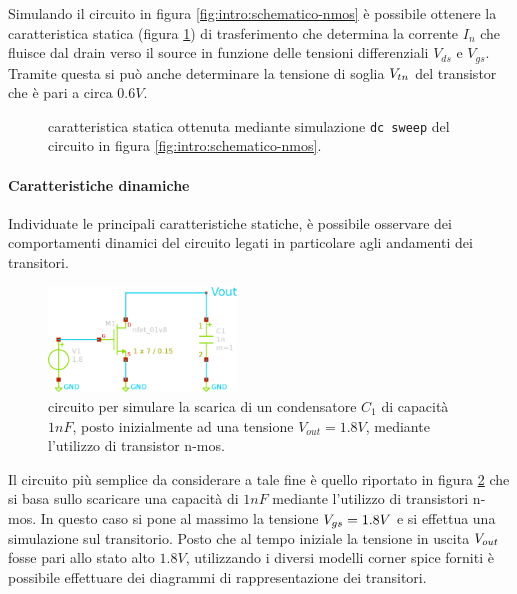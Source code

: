 		Simulando il circuito in figura \ref{fig:intro:schematico-nmos} è possibile ottenere la caratteristica statica (figura \ref{fig:intro:nmos-carattstatica}) di trasferimento che determina la corrente $I_n$ che fluisce dal drain verso il source in funzione delle tensioni differenziali $V_{ds}$ e $V_{gs}$. Tramite questa si può anche determinare la tensione di soglia $V_{tn}$ del transistor che è pari a circa $0.6V$.
		
		\begin{figure}[h!]
			\centering
			
			\caption{caratteristica statica ottenuta mediante simulazione \texttt{dc sweep} del circuito in figura \ref{fig:intro:schematico-nmos}.}
			\label{fig:intro:nmos-carattstatica}
		\end{figure}
		
	
		\paragraph{Caratteristiche dinamiche} Individuate le principali caratteristiche statiche, è possibile osservare dei comportamenti dinamici del circuito legati in particolare agli andamenti dei transitori.
	
		
		\begin{figure}[bht]
			\centering
			\includegraphics[width=5cm]{Immagini/circuito_transitorio.eps}
			\caption{circuito per simulare la scarica di un condensatore $C_1$ di capacità $1nF$, posto inizialmente ad una tensione $V_{out} = 1.8V$, mediante l'utilizzo di transistor n-mos.} \label{fig:intro:schematico-transitorio}
		\end{figure}
	
		Il circuito più semplice da considerare a tale fine è quello riportato in figura \ref{fig:intro:schematico-transitorio} che si basa sullo scaricare una capacità di $1nF$ mediante l'utilizzo di transistori n-mos. In questo caso si pone al massimo la tensione $V_{gs} = 1.8V$ e si effettua una simulazione sul transitorio. Posto che al tempo iniziale la tensione in uscita $V_{out}$ fosse pari allo stato alto $1.8V$, utilizzando i diversi modelli corner spice forniti è possibile effettuare dei diagrammi di rappresentazione dei transitori.
	
